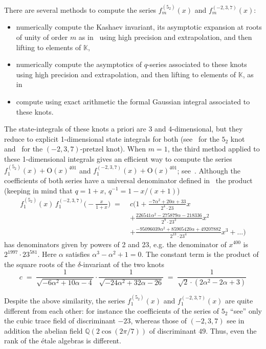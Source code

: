 \documentclass[12pt,reqno]{amsart}
\theoremstyle{definition}
\def\BQ{\mathbb Q}
\def\BK{\mathbb K}
\def\a{\alpha}
\def\be{\begin{equation}}
\def\ee{\end{equation}}
\def\={\;=\;}
\def\Phitof{f}
\begin{document}
There are several methods to compute the series $\Phitof^{(5_2)}_m(x)$ and
$\Phitof^{(-2,3,7)}_m(x)$: 
\begin{itemize}
\item
  numerically compute the Kashaev invariant, its asymptotic expansion
  at roots of unity of order $m$ as in~\cite[Eqn.(1.5)]{GZ:kashaev} using
  high precision and extrapolation, and then lifting to elements of $\BK$,
\item
  numerically compute the asymptotics of $q$-series associated to these knots
  using high precision and extrapolation, and then lifting to elements of $\BK$,
  as in~\cite{GZ:qseries}
\item
  compute using exact arithmetic the formal Gaussian integral associated to these
  knots.
\end{itemize}
The state-integrals of these knots a priori are 3 and 4-dimensional, but they
reduce to explicit 1-dimensional state integrals for both (see~\cite[Eqn.(39)]{AK}
for the $5_2$ knot and~\cite[Eqn.(58)]{GK:evaluation} for the $(-2,3,7)$-pretzel knot).
When $m=1$, the third method applied to these 1-dimensional integrals gives an
efficient way to compute the series $\Phitof^{(5_2)}_1(x) + \mathrm{O}(x)^{401}$ and
$\Phitof^{(-2,3,7)}_1(x) + \mathrm{O}(x)^{401}$; see~\cite[Sec.4]{AGL}. Although the
coefficients of both series have a universal denominator defined
in~\cite[Thm.9.1]{GZ:kashaev} the product (keeping in mind that
$q=1+x$, $q^{-1}=1 -x/(x+1)$)
\be
\begin{aligned}
\Phitof^{(5_2)}_1(x)\,\Phitof^{(-2,3,7)}_1\Big(-\frac{x}{1+x}\Big) \= &
c \Big( 1 + \frac{-7 \a^2 + 20 \a + 33}{2^4 \cdot 23} x \\
& + \frac{226541 \a^2 - 275879 \a - 218336}{2^9 \cdot 23^3} x^2 \\
& + \frac{-95096039 \a^2 + 85905420 \a + 49207882}{2^{13} \cdot 23^4} x^3 
+ \dots \Big)
\end{aligned}
\ee
has denominators given by powers of 2 and 23, e.g.
the denominator of $x^{400}$ is $2^{1997} \cdot  23^{581}$. Here $\a$ satisfies
$\a^3-\a^2+1=0$. The constant term is the product of the square roots of
the $\delta$-invariant of the two knots
\be
c \= \frac{1}{\sqrt{-6 \a^2 + 10 \a -4}} \cdot
\frac{1}{\sqrt{-24 \a^2 + 32 \a -26}} \= \frac{1}{\sqrt{2} \cdot (2 \a^2 -2\a+3)}
\ee


Despite the above similarity, the series $\Phitof^{(5_2)}_1(x)$ and
$\Phitof^{(-2,3,7)}_1(x)$
are quite different from each other: for instance the coefficients of the
series of $5_2$ ``see'' only the cubic trace field of discriminant $-23$, whereas
those of $(-2,3,7)$ see in addition the abelian field $\BQ(2\cos(2\pi/7))$ of
discriminant $49$. Thus, even the rank of the étale algebras is different.
\end{document}
